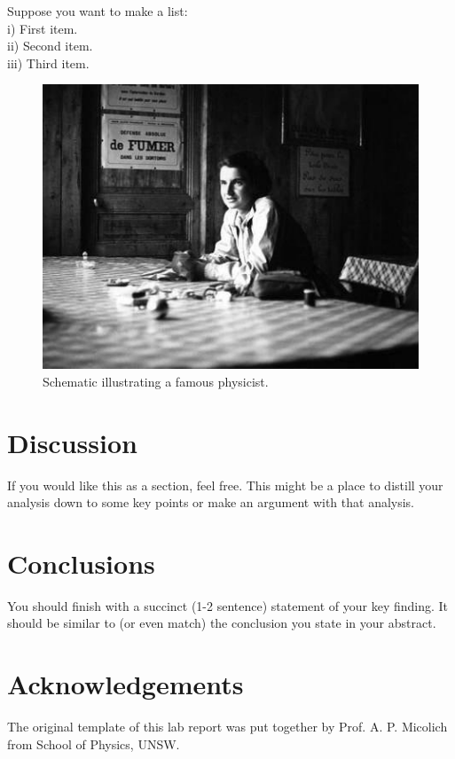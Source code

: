 \documentclass[aps,prl,reprint,10pt,amsmath,amssymb,superscriptaddress,a4paper]{revtex4-2}
\begin{document}
\lipsum[5] %

Suppose you want to make a list:\\

\noindent i) First item.\\

\noindent ii) Second item.\\

\noindent iii) Third item.\\

\lipsum[6] %

\lipsum[7] %

\begin{figure}
\includegraphics[width = 8 cm]{physicist}
\caption{Schematic illustrating a famous physicist.}
\end{figure}

\lipsum[8] %

\section{Discussion}

If you would like this as a section, feel free. This might be a place to distill your analysis down to some key points or make an argument with that analysis.\cite{Other:2014ab}

\lipsum[9] %

\lipsum[10] %

\section{Conclusions}

You should finish with a succinct (1-2 sentence) statement of your key finding. It should be similar to (or even match) the conclusion you state in your abstract.

\section{Acknowledgements}

The original template of this lab report was put together by Prof. A. P. Micolich from School of Physics, UNSW.



\end{document}
